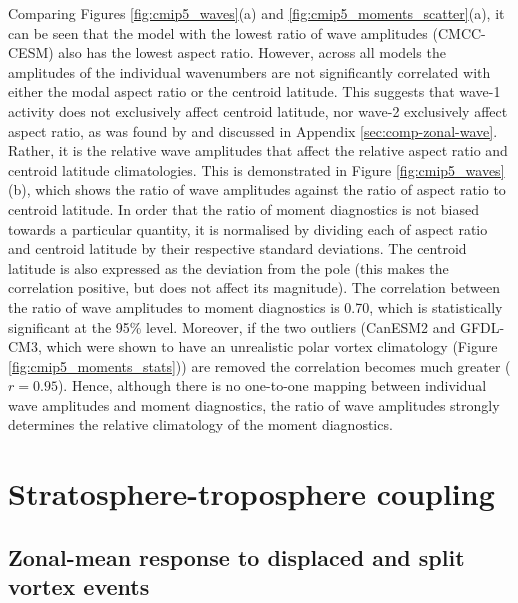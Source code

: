 Comparing Figures \ref{fig:cmip5_waves}(a) and
\ref{fig:cmip5_moments_scatter}(a), it can be seen that the model with the
lowest ratio of wave amplitudes (CMCC-CESM) also has the lowest aspect
ratio. However, across all models the amplitudes of the individual wavenumbers
are not significantly correlated with either the modal aspect ratio or the
centroid latitude. This suggests that wave-1 activity does not exclusively
affect centroid latitude, nor wave-2 exclusively affect aspect ratio, as was
found by \citet{Waugh1997} and discussed in Appendix
\ref{sec:comp-zonal-wave}. Rather, it is the relative wave amplitudes that
affect the relative aspect ratio and centroid latitude climatologies. This is
demonstrated in Figure \ref{fig:cmip5_waves}(b), which shows the ratio of wave
amplitudes against the ratio of aspect ratio to centroid latitude. In order that
the ratio of moment diagnostics is not biased towards a particular quantity, it
is normalised by dividing each of aspect ratio and centroid latitude by their
respective standard deviations. The centroid latitude is also expressed as the
deviation from the pole (this makes the correlation positive, but does not
affect its magnitude). The correlation between the ratio of wave amplitudes to
moment diagnostics is 0.70, which is statistically significant at the 95\%
level. Moreover, if the two outliers (CanESM2 and GFDL-CM3, which were shown to
have an unrealistic polar vortex climatology (Figure
\ref{fig:cmip5_moments_stats})) are removed the correlation becomes much greater
($r=0.95$). Hence, although there is no one-to-one mapping between individual
wave amplitudes and moment diagnostics, the ratio of wave amplitudes strongly
determines the relative climatology of the moment diagnostics.



\section{Stratosphere-troposphere coupling}
\subsection{Zonal-mean response to displaced and split vortex events}

